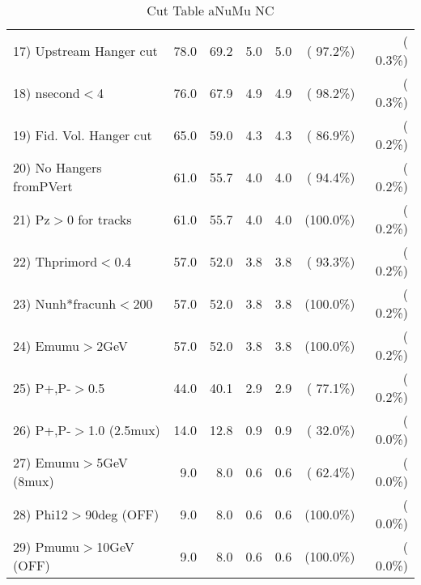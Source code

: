 \begin{table}[h!]
\begin{tabular}{||l||r|r|r|r|r|r||}
 17) Upstream Hanger cut  &         78.0 &         69.2 &          5.0 &          5.0 & ( 97.2\%) & (  0.3\%) \\
 18) nsecond$<$4          &         76.0 &         67.9 &          4.9 &          4.9 & ( 98.2\%) & (  0.3\%) \\
 19) Fid. Vol. Hanger cut &         65.0 &         59.0 &          4.3 &          4.3 & ( 86.9\%) & (  0.2\%) \\
 20) No Hangers fromPVert &         61.0 &         55.7 &          4.0 &          4.0 & ( 94.4\%) & (  0.2\%) \\
 21) Pz$>$0 for tracks    &         61.0 &         55.7 &          4.0 &          4.0 & (100.0\%) & (  0.2\%) \\
 22) Thprimord$<$0.4      &         57.0 &         52.0 &          3.8 &          3.8 & ( 93.3\%) & (  0.2\%) \\
 23) Nunh*fracunh$<$200   &         57.0 &         52.0 &          3.8 &          3.8 & (100.0\%) & (  0.2\%) \\
 24) Emumu$>$2GeV         &         57.0 &         52.0 &          3.8 &          3.8 & (100.0\%) & (  0.2\%) \\
 25) P+,P-$>$0.5          &         44.0 &         40.1 &          2.9 &          2.9 & ( 77.1\%) & (  0.2\%) \\
 26) P+,P-$>$1.0 (2.5mux) &         14.0 &         12.8 &          0.9 &          0.9 & ( 32.0\%) & (  0.0\%) \\
 27) Emumu$>$5GeV  (8mux) &          9.0 &          8.0 &          0.6 &          0.6 & ( 62.4\%) & (  0.0\%) \\
 28) Phi12$>$90deg  (OFF) &          9.0 &          8.0 &          0.6 &          0.6 & (100.0\%) & (  0.0\%) \\
 29) Pmumu$>$10GeV  (OFF) &          9.0 &          8.0 &          0.6 &          0.6 & (100.0\%) & (  0.0\%) \\
 \hline
 \hline
 \end{tabular}
 \caption{Cut Table  aNuMu NC }
 \label{tab-cutcohjpsi-mumu_anumunc}
 \end{table}
